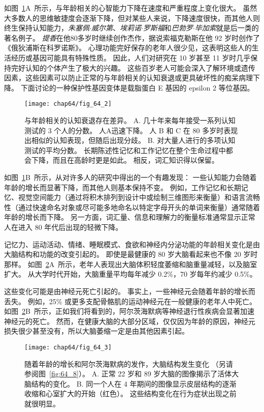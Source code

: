 如图~\ref{fig:64_2}A~所示，与年龄相关的心智能力下降在速度和严重程度上变化很大。
虽然大多数人的思维敏捷度会逐渐下降，但对某些人来说，下降速度很快，而其他人则终生保持认知能力，\textit{朱塞佩$\cdot$威尔第}、\textit{埃莉诺$\cdot$罗斯福}和\textit{巴勃罗$\cdot$毕加索}就是后一类的著名例子。
\textit{提香}在他80多岁时继续创作杰作，据说索福克勒斯在他 92 岁时创作了《俄狄浦斯在科罗诺斯》。
心理功能完好保存的老年人很少见，这表明这些人的生活经历或基因可能具有特殊性质。
因此，人们对研究在 10 岁甚至 11 岁时几乎保持完好认知的个体产生了极大的兴趣。
这些百岁老人可能会深入了解环境或遗传因素，这些因素可以防止正常的与年龄相关的认知衰退或更具破坏性的痴呆病理下降。
下面讨论的一种保护性基因变体是载脂蛋白 E 基因的 epsilon 2 等位基因。


\begin{figure}[htbp]
	\centering
	\texttt{[image: chap64/fig\_64\_2]}
	\caption{与年龄相关的认知衰退存在差异。
		A. 几十年来每年接受一系列认知测试的 3 个人的分数。
		人A迅速下降。
		人 B 和 C 在 80 多岁时表现出相似的认知表现，但随后出现分歧\cite{rubin1998prospective}。
		B. 对大量人进行的多项认知测试的平均分数。
		长期陈述性记忆和工作记忆在整个生命过程中都会下降，而且在高龄时更是如此。
		相反，词汇知识得以保留\cite{park1996mediators}。}
	\label{fig:64_2}
\end{figure}


如图~\ref{fig:64_2}B~所示，从对许多人的研究中得出的一个有趣发现：
一些认知能力会随着年龄的增长而显著下降，而其他人则基本保持不变。
例如，工作记忆和长期记忆、视觉空间能力（通过将积木排列到设计中或绘制三维图形来衡量）和语言流畅性（通过快速命名对象或尽可能多地命名以特定字母开头的单词来衡量）通常随着年龄的增长而下降。
另一方面，词汇量、信息和理解力的衡量标准通常显示正常人在进入 80 年代后出现的轻微下降。


记忆力、运动活动、情绪、睡眠模式、食欲和神经内分泌功能的年龄相关变化是由大脑结构和功能的改变引起的。
即使是最健康的 80 岁大脑看起来也不像 20 岁时那样。
如图~\ref{fig:64_3}A~所示，老年人表现出大脑体积轻度萎缩和脑重量减轻，以及脑室扩大。
从大学时代开始，大脑重量平均每年减少 0.2\%，70 岁每年约减少 0.5\%。


这些变化可能是由神经元死亡引起的。
事实上，一些神经元会随着年龄的增长而丢失。
例如，25\% 或更多支配骨骼肌的运动神经元在一般健康的老年人中死亡。
如图~\ref{fig:64_3}B~所示，正如我们将看到的，阿尔茨海默病等神经退行性疾病会显著加速神经元的死亡。
然而，在健康大脑的大部分区域，仅仅因为年龄的原因，神经元损失很少甚至没有，所以大脑萎缩一定是由其他因素引起。


\begin{figure}[htbp]
	\centering
	\texttt{[image: chap64/fig\_64\_3]}
	\caption{随着年龄的增长和阿尔茨海默病的发作，大脑结构发生变化		（另请参阅图~\ref{fig:64_8}）。
		A. 正常 22 岁和 89 岁大脑的图像揭示了活体大脑结构的变化。
		B. 同一个人在 4 年期间的图像显示皮层结构的逐渐收缩和心室扩大的开始（红色）。
		这些结构变化在行为症状出现之前就很明显。}
	\label{fig:64_3}
\end{figure}


